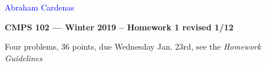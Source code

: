 \documentclass[11pt]{article}
\begin{document}
\textcolor{blue}{\hfill Abraham Cardenas} 

\begin{center}
{\bf\Large CMPS 102 --- Winter 2019 --  Homework 1 \normalsize revised 1/12}
\end{center}

\begin{center}
Four problems, 36 points, due Wednesday Jan. 23rd, see the \emph{Homework Guidelines} 
\end{center}


\renewcommand{\P}{\mbox{IH}}
\end{document}
